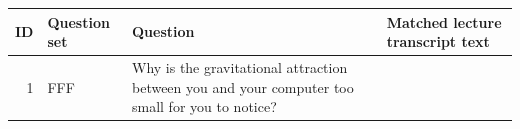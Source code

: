 \documentclass[10pt]{article}
\begin{document}
\begin{tiny}
    \renewcommand*{\arraystretch}{1.4}
    \begin{longtable}{|r|p{0.375in}|p{1.275in}|p{3.5in}|}
        \hline
        \textbf{ID} & \textbf{Question set} & \textbf{Question} & \textbf{Matched lecture transcript text} \\\hline
        1  &          FFF &                                                                                                                                                                                   Why is the gravitational attraction between you and your computer too small for you to notice? &                                                                                                                                                                                                                                                                                                                                                                                                                                                                                                                                                                                                                                                                                                                                                                                                                                                                                                                                                                                                                                                                                                                                                                                                                                                                                                                                                                                                                                                                                                                                                                                                                                                                                                                                                                                                                                                                                                                                                                                                                                                                                                                                                                                                                                                                                                                                                                                                                                                                                                                                                                                                                                                                                                                                                                         
\end{longtable}
\end{tiny}
\end{document}
